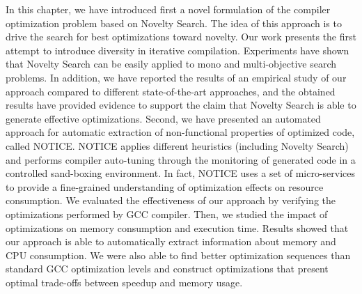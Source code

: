 In this chapter, we have introduced first a novel formulation of the compiler optimization problem based on Novelty Search. The idea of this approach is to drive the search for best optimizations toward novelty. 
Our work presents the first attempt to introduce diversity in iterative compilation. Experiments have shown that Novelty Search can be easily applied to mono and multi-objective search problems. 
In addition, we have reported the results of an empirical study of our approach compared to different state-of-the-art approaches, and the obtained results have provided evidence to support the claim that Novelty Search is able to generate effective optimizations.
Second, we have presented an automated approach for automatic extraction of non-functional properties of optimized code, called NOTICE. NOTICE applies different heuristics (including Novelty Search) and performs compiler auto-tuning through the monitoring of generated code in a controlled sand-boxing environment. In fact, NOTICE uses a set of micro-services to provide a fine-grained understanding of optimization effects on resource consumption. 
We evaluated the effectiveness of our approach by verifying the optimizations performed by GCC compiler. Then, we studied the impact of optimizations on memory consumption and execution time.
Results showed that our approach is able to automatically extract information about memory and CPU consumption. We were also able to find better optimization sequences than standard GCC optimization levels and construct optimizations that present optimal trade-offs between speedup and memory usage.





